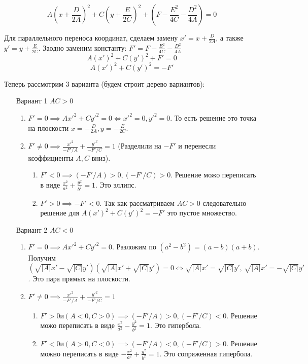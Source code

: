 \documentclass[a4paper,12pt]{article}
\begin{document}
\[
    A \left( x + \frac{D}{2A} \right) ^2 
+ C \left( y + \frac{E}{2C}  \right) ^2 
+ \left( F - \frac{E^2}{4C}  - \frac{D^2}{4A} \right) = 0
\]

Для параллельного переноса координат, сделаем замену 
$x' = x + \frac{D}{2A}$, а также 
$y' = y + \frac{E}{2C}$. 
Заодно заменим константу:
$F' = F - \frac{E^2}{4C}  - \frac{D^2}{4A}$
\[
A(x')^2 + C(y')^2 + F' = 0
\]
\[
A(x')^2 + C(y')^2 = - F'
\]

Теперь рассмотрим 3 варианта (будем строит дерево вариантов):
\begin{enumerate}
\item[Вариант 1] $AC > 0$
\begin{enumerate}
\item  $ F' = 0 \implies Ax'^2 + Cy'^2 = 0 \iff x'^2 = 0, y'^2 = 0$. То есть решение это точка на 
плоскости $x = - \frac{D}{2A}, y = - \frac{E}{2C}$.

\item $ F' \neq 0 \implies \frac{x'^2}{-F' / A} +  \frac{y'^2}{-F' / C} = 1$ (Разделили на $ - F'$ и перенесли коэффициенты $A, C$ вниз). 
\begin{enumerate}
\item $ F' < 0 \implies  (-F' / A) > 0 , (-F' / C)  > 0 $. 
Решение можо переписать в виде $ \frac{x^2}{a^2} + \frac{y^2}{b^2} = 1 $. Это эллипс.
\item $ F' > 0 \implies -F' < 0 $. Так как рассматриваем 
$ AC > 0 $ следовательно решение для $ A(x')^2 + C(y')^2 = - F' $ это пустое множество. 
\end{enumerate}

\end{enumerate}

\bigskip
\item[Вариант 2] $AC < 0$
\begin{enumerate}
\item  $ F' = 0 \implies Ax'^2 + Cy'^2 = 0 $. 
Разложим по $ ( a^2 - b^2 ) = (a - b)(a + b) $. 
Получим $ (\sqrt{|A|}x' - \sqrt{|C|}y')(\sqrt{|A|}x' + \sqrt{|C|}y') = 0 
\iff
\sqrt{|A|}x' = \sqrt{|C|}y', \, \sqrt{|A|}x' = - \sqrt{|C|}y' $.
 Это пара прямых на плоскости.

\item $ F' \neq 0 \implies \frac{x'^2}{-F' / A} +  \frac{y'^2}{-F' / C} = 1$ 
\begin{enumerate}
\item $  F' > 0 и (A < 0, C > 0) \implies  (-F' / A) > 0,  (-F' / C)  < 0 $. 
Решение можо переписать в виде $ \frac{x^2}{a^2} - \frac{y^2}{b^2} = 1 $. 
Это гипербола.
\item $ F' < 0 и (A > 0, C < 0) \implies   (-F' / A) < 0,  (-F' / C)  > 0 $. 
Решение можно переписать в виде $ - \frac{x^2}{a^2} + \frac{y^2}{b^2} = 1 $. 
Это сопряженная гипербола.
\end{enumerate}


\end{enumerate}
\end{enumerate}
\end{document}
